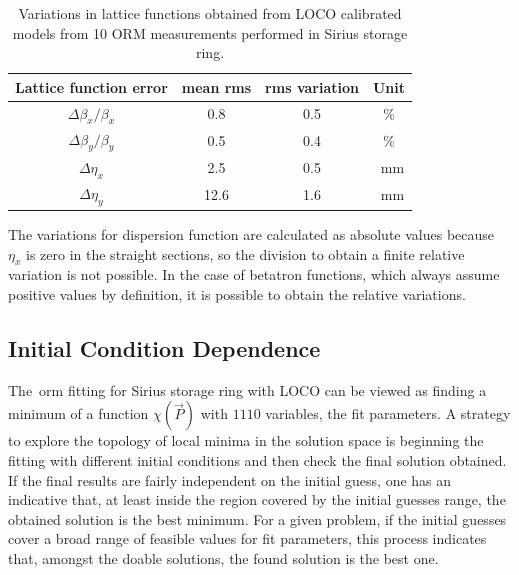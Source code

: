 \begin{table}
    \centering
    \caption{Variations in lattice functions obtained from LOCO calibrated models from 10 ORM measurements performed in Sirius storage ring.}
    \label{tab:twiss_var}
    \begin{tabular}{cccc}
        \toprule\toprule
        Lattice function error & mean rms & rms variation & Unit \\
        \hline
        $\Delta\beta_x/\beta_x$ & \num{0.8}& \num{0.5} & \%\\
        $\Delta\beta_y/\beta_y$ & \num{0.5} & \num{0.4}& \% \\
        $\Delta\eta_x$ & \num{2.5} & \num{0.5} & \SI{}{\milli\meter}\\
        $\Delta\eta_y$ & \num{12.6} & \num{1.6} & \SI{}{\milli\meter} \\
        \bottomrule\bottomrule
    \end{tabular}
\end{table}

The variations for dispersion function are calculated as absolute values because $\eta_x$ is zero in the straight sections, so the division to obtain a finite relative variation is not possible. In the case of betatron functions, which always assume positive values by definition, it is possible to obtain the relative variations.
\subsection{Initial Condition Dependence}
The~\gls{orm} fitting for Sirius storage ring with LOCO can be viewed as finding a minimum of a function $\chi\left(\Vec{P}\right)$ with $1110$ variables, the fit parameters. A strategy to explore the topology of local minima in the solution space is beginning the fitting with different initial conditions and then check the final solution obtained. If the final results are fairly independent on the initial guess, one has an indicative that, at least inside the region covered by the initial guesses range, the obtained solution is the best minimum. For a given problem, if the initial guesses cover a broad range of feasible values for fit parameters, this process indicates that, amongst the doable solutions, the found solution is the best one.

